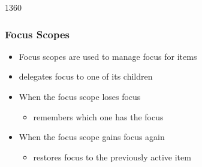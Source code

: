 \begin{slide}{1360}\frametitle{Focus Scopes}

\begin{itemize}
\item Focus scopes are used to manage focus for items
\item {} delegates focus to one of its children
\item When the focus scope loses focus
  \begin{itemize}
  \item remembers which one has the focus
  \end{itemize}
\item When the focus scope gains focus again
  \begin{itemize}
  \item restores focus to the previously active item
  \end{itemize}
\end{itemize}


\end{slide}
